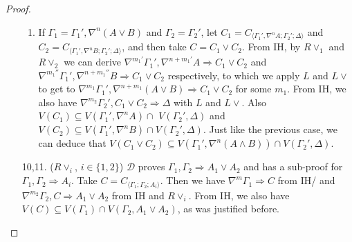 \documentclass[12pt,a4paper]{article}
\theoremstyle{plain}
\theoremstyle{definition}
\begin{document}
\begin{proof}
\begin{enumerate}
\begin{enumerate}
			\item If $\Gamma_1 = \Gamma_1' , \nabla^n (A \lor B)$ and $\Gamma_2 = \Gamma_2'$, let $C_1 = C_{\langle\Gamma_1',\nabla^n A;\Gamma_2';\Delta\rangle}$ and $C_2 = C_{\langle\Gamma_1',\nabla^n B;\Gamma_2';\Delta\rangle}$, and then take $C = C_1 \lor C_2$.
			From IH, by $R\lor_1$ and $R\lor_2$ we can derive $\nabla^{m_1'} \Gamma_1',\nabla^{n+m_1'} A \Rightarrow C_1 \lor C_2$ and $\nabla^{m_1''} \Gamma_1', \nabla^{n+m_1''} B \Rightarrow C_1 \lor C_2$ respectively, to which we apply $L$ and $L\vee$ to get to $\nabla^{m_1} \Gamma_1', \nabla^{n+m_1} (A \lor B) \Rightarrow C_1 \lor C_2$ for some $m_1$.
			From IH, we also have $\nabla^{m_2} \Gamma_2' , C_1 \lor C_2 \Rightarrow \Delta$ with $L$ and $L\lor$.
			Also $V(C_1) \subseteq V(\Gamma_1' , \nabla^n A) \cap$ $V(\Gamma_2' , \Delta)$ and $V(C_2) \subseteq V(\Gamma_1' , \nabla^n B) \cap V(\Gamma_2' , \Delta)$. Just like the previous case, we can deduce that $V(C_1 \lor C_2) \subseteq V(\Gamma_1' , \nabla^n (A \land B)) \cap V(\Gamma_2' , \Delta)$.
		\end{enumerate}

		\item[10,11.] ($R\lor_i$, {\small$i \in \{1,2\}$}) $\mathcal{D}$ proves $\Gamma_1 , \Gamma_2 \Rightarrow A_1 \lor A_2$ and has a sub-proof for $\Gamma_1 , \Gamma_2 \Rightarrow A_i$. Take $C = C_{\langle\Gamma_1;\Gamma_2;A_i\rangle}$. Then we have $\nabla^m \Gamma_1 \Rightarrow C$ from IH/ and $\nabla^{m_2} \Gamma_2 , C \Rightarrow A_1 \lor A_2$ from IH and $R\lor_i$.
		From IH, we also have $V(C) \subseteq V(\Gamma_1) \cap V(\Gamma_2 , A_1 \lor A_2)$, as was justified before.
		\setcounter{enumi}{11}


\end{enumerate}
\end{proof}
\end{document}
